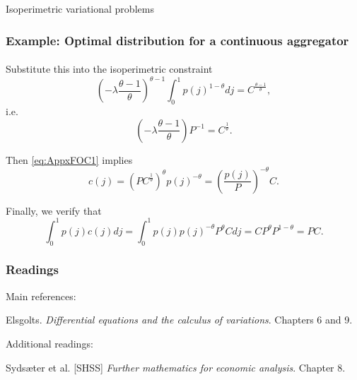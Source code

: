 \documentclass[10pt]{beamer}
\theoremstyle{definition}
\begin{document}
\begin{section}{Isoperimetric variational problems}
\begin{frame}[fragile]
\frametitle{Example: Optimal distribution for a continuous aggregator}
\framesubtitle{}
Substitute this into the isoperimetric constraint
\[ \left( -\lambda \frac{\theta-1}{\theta} \right)^{\theta-1}\int_0^1 p(j)^{1-\theta} dj =
C^{\frac{\theta-1}{\theta}},\] i.e. \[ \left( -\lambda \frac{\theta-1}{\theta} \right) P^{-1} = C^{\frac{1}{\theta}}. \]

Then \eqref{eq:AppxFOC1} implies
\[ c(j)=\left(PC^{\frac{1}{\theta}}\right)^\theta p(j)^{-\theta}=\left( \frac{p(j)}{P} \right)^{-\theta}C . \]

Finally, we verify that \begin{equation*}  \int_0^1 p(j)c(j)dj =  \int_0^1 p(j) p(j)^{-\theta} P^\theta C dj =   C P^\theta
P^{1-\theta} = PC.  \end{equation*}
\end{frame}


\end{section}
\begin{frame}[fragile]
\frametitle{Readings}
Main references:

Elsgolts. \emph{Differential equations and the calculus of variations}. Chapters 6 and 9.\bigskip

Additional readings:

Syds\ae{}ter et al. [SHSS] \emph{Further mathematics for economic analysis}. Chapter 8.

\end{frame}
\end{document}
